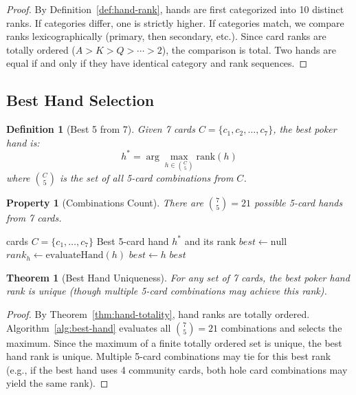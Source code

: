 \documentclass[11pt,a4paper]{article}
\newtheorem{definition}{Definition}[section]
\newtheorem{theorem}{Theorem}[section]
\newtheorem{property}{Property}[section]
\begin{document}
\begin{proof}
By Definition~\ref{def:hand-rank}, hands are first categorized into 10 distinct ranks. If categories differ, one is strictly higher. If categories match, we compare ranks lexicographically (primary, then secondary, etc.). Since card ranks are totally ordered ($A > K > Q > \cdots > 2$), the comparison is total. Two hands are equal if and only if they have identical category and rank sequences.
\end{proof}

\subsection{Best Hand Selection}

\begin{definition}[Best 5 from 7]
\label{def:best5from7}
Given 7 cards $C = \{c_1, c_2, \ldots, c_7\}$, the best poker hand is:
\[
h^* = \arg\max_{h \in \binom{C}{5}} \text{rank}(h)
\]
where $\binom{C}{5}$ is the set of all 5-card combinations from $C$.
\end{definition}

\begin{property}[Combinations Count]
There are $\binom{7}{5} = 21$ possible 5-card hands from 7 cards.
\end{property}

\begin{algorithm}
\caption{Best Hand Evaluation}
\label{alg:best-hand}
\begin{algorithmic}[1]
 cards $C = \{c_1, \ldots, c_7\}$
\Ensure Best 5-card hand $h^*$ and its rank
\State $best \leftarrow \text{null}$
    \State $rank_h \leftarrow \text{evaluateHand}(h)$
        \State $best \leftarrow h$
    \EndIf
\EndFor
\State \Return $best$
\end{algorithmic}
\end{algorithm}

\begin{theorem}[Best Hand Uniqueness]
\label{thm:best-hand-unique}
For any set of 7 cards, the best poker hand rank is unique (though multiple 5-card combinations may achieve this rank).
\end{theorem}

\begin{proof}
By Theorem~\ref{thm:hand-totality}, hand ranks are totally ordered. Algorithm~\ref{alg:best-hand} evaluates all $\binom{7}{5} = 21$ combinations and selects the maximum. Since the maximum of a finite totally ordered set is unique, the best hand rank is unique. Multiple 5-card combinations may tie for this best rank (e.g., if the best hand uses 4 community cards, both hole card combinations may yield the same rank).
\end{proof}
\end{document}
